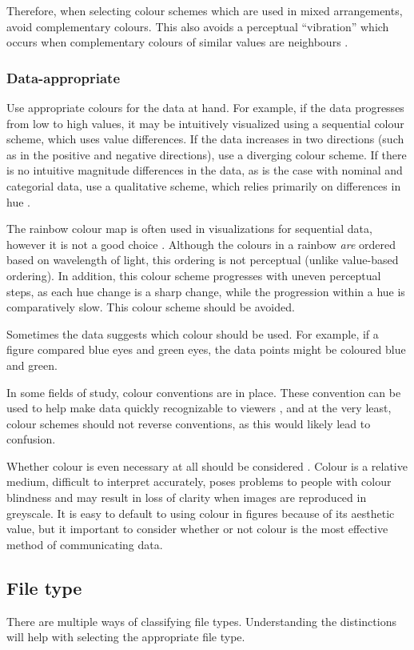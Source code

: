\documentclass[letterpaper]{report}\usepackage[]{graphicx}\usepackage[]{color}
\begin{document}
Therefore, when selecting colour schemes which are used in mixed arrangements, avoid complementary colours. This also avoids a perceptual ``vibration'' which occurs when complementary colours of similar values are neighbours \cite{brewers-sim}.

\subsubsection{Data-appropriate}
Use appropriate colours for the data at hand. For example, if the data progresses from low to high values, it may be intuitively visualized using a sequential colour scheme, which uses value differences. If the data increases in two directions (such as in the positive and negative directions), use a diverging colour scheme. If there is no intuitive magnitude differences in the data, as is the case with nominal and categorial data, use a qualitative scheme, which relies primarily on differences in hue \cite{brewer-colour}.

The rainbow colour map is often used in visualizations for sequential data, however it is not a good choice \cite{rainbow}. Although the colours in a rainbow \textit{are} ordered based on wavelength of light, this ordering is not perceptual (unlike value-based ordering). In addition, this colour scheme progresses with uneven perceptual steps, as each hue change is a sharp change, while the progression within a hue is comparatively slow. This colour scheme should be avoided.

Sometimes the data suggests which colour should be used. For example, if a figure compared blue eyes and green eyes, the data points might be coloured blue and green. 

In some fields of study, colour conventions are in place. These convention can be used to help make data quickly recognizable to viewers \cite{rheingans}, and at the very least, colour schemes should not reverse conventions, as this would likely lead to confusion. 

Whether colour is even necessary at all should be considered \cite{wong-avoid-colour}. Colour is a relative medium, difficult to interpret accurately, poses problems to people with colour blindness and may result in loss of clarity when images are reproduced in greyscale. It is easy to default to using colour in figures because of its aesthetic value, but it important to consider whether or not colour is the most effective method of communicating data.

\subsection{File type}
There are multiple ways of classifying file types. Understanding the distinctions will help with selecting the appropriate file type.
\end{document}
